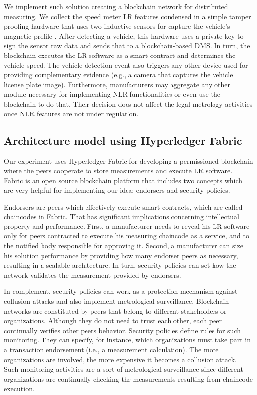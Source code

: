 \documentclass[journal]{IEEEtran}
\begin{document}
We implement such solution creating a blockchain network for distributed measuring.
We collect the speed meter LR features condensed in a simple tamper proofing hardware that uses two inductive sensors for capture the vehicle's magnetic profile \cite{S2011}.
After detecting a vehicle, this hardware uses a private key to sign the sensor raw data and sends that to a blockchain-based DMS.
In turn, the blockchain executes the LR software as a smart contract and determines the vehicle speed.
The vehicle detection event also triggers any other device used for providing complementary evidence (e.g., a camera that captures the vehicle license plate image).
Furthermore, manufacturers may aggregate any other module necessary for implementing NLR functionalities or even use the blockchain to do that.
Their decision does not affect the legal metrology activities once NLR features are not under regulation.

\subsection{Architecture model using Hyperledger Fabric}
Our experiment uses Hyperledger Fabric \cite{Androulaki2018} for developing a permissioned blockchain where the peers cooperate to store measurements and execute LR software.
Fabric is an open source blockchain platform that includes two concepts which are very helpful for implementing our idea: endorsers and security policies.

Endorsers are peers which effectively execute smart contracts, which are called chaincodes in Fabric.
That has significant implications concerning intellectual property and performance.
First, a manufacturer needs to reveal his LR software only for peers contracted to execute his measuring chaincode as a service, and to the notified body responsible for approving it.
Second, a manufacturer can size his solution performance by providing how many endorser peers as necessary, resulting in a scalable architecture.
In turn, security policies can set how the network validates the measurement provided by endorsers.

In complement, security policies can work as a protection mechanism against collusion attacks and also implement metrological surveillance.
Blockchain networks are constituted by peers that belong to different stakeholders or organizations.
Although they do not need to trust each other, each peer continually verifies other peers behavior.
Security policies define rules for such monitoring.
They can specify, for instance, which organizations must take part in a transaction endorsement (i.e., a measurement calculation).
The more organizations are involved, the more expensive it becomes a collusion attack.
Such monitoring activities are a sort of metrological surveillance since different organizations are continually checking the measurements resulting from chaincode execution.
\end{document}
